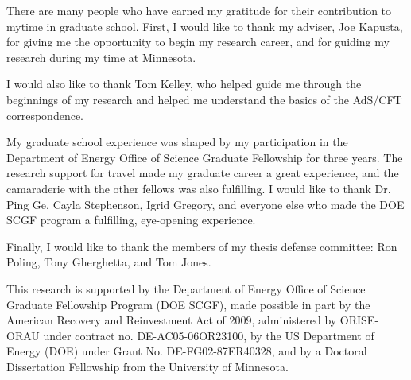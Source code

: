 
There are many people who have earned my gratitude for their contribution to mytime in graduate school. 
First, I would like to thank my adviser, Joe Kapusta, for giving me the opportunity to begin my research career, and for guiding my research during my time at Minnesota.

I would also like to thank Tom Kelley, who helped guide me through the beginnings of my research and helped me understand the basics of the AdS/CFT correspondence.

My graduate school experience was shaped by my participation in the Department of Energy Office of Science Graduate Fellowship for three years. 
The research support for travel made my graduate career a great experience, and the camaraderie with the other fellows was also fulfilling.
I would like to thank Dr. Ping Ge, Cayla Stephenson, Igrid Gregory, and everyone else who made the DOE SCGF program a fulfilling, eye-opening experience.

Finally, I would like to thank the members of my thesis defense committee: Ron Poling, Tony Gherghetta, and Tom Jones.

This research is supported by the Department of Energy Office of Science Graduate Fellowship Program (DOE SCGF), made possible in part by the American Recovery and Reinvestment Act of 2009, administered by ORISE-ORAU under contract no. DE-AC05-06OR23100, by the US Department of Energy (DOE) under Grant No. DE-FG02-87ER40328, and by a Doctoral Dissertation Fellowship from the University of Minnesota.

